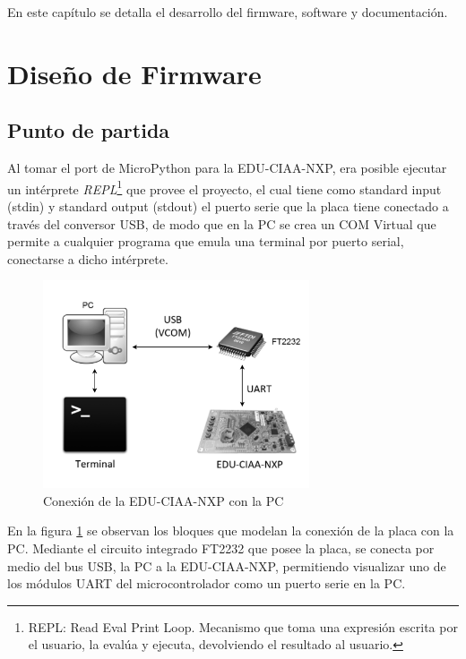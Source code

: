 En este capítulo se detalla el desarrollo del firmware, software y documentación.

\section{Diseño de Firmware}

\subsection{Punto de partida} 

Al tomar el port de MicroPython para la EDU-CIAA-NXP, era posible ejecutar un intérprete \textit{REPL}\footnote{REPL: Read Eval Print Loop. Mecanismo que toma una expresión escrita por el usuario, la evalúa y ejecuta, devolviendo el resultado al usuario.} que provee el proyecto, el cual tiene como standard input (stdin) y standard output (stdout) el puerto serie que la placa tiene conectado a través del conversor USB, de modo que en la PC se crea un COM Virtual que permite a cualquier programa que emula una terminal por puerto serial, conectarse a dicho intérprete.

\begin{figure}[h]
  \centering
    \includegraphics[width=0.7\textwidth]{Figures/fig_conexion}
  \caption{Conexión de la EDU-CIAA-NXP con la PC}
  \label{fig:conexion}
\end{figure}

En la figura \ref{fig:conexion} se observan los bloques que modelan la conexión de la placa con la PC. Mediante el circuito integrado FT2232 que posee la placa, se conecta por medio del bus USB, la PC a la EDU-CIAA-NXP, permitiendo visualizar uno de los módulos UART del microcontrolador como un puerto serie en la PC.

